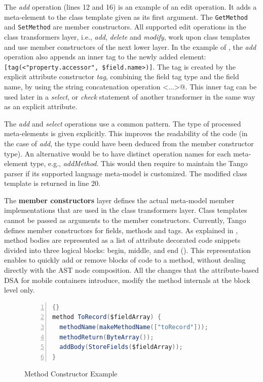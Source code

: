 The \textit{add} operation (lines 12 and 16) is an example of an edit operation. It adds a meta-element to the class template given as its first argument. The {\tt Get\-Me\-thod} and {\tt Set\-Me\-thod} are member constructors. All supported edit operations in the class transformers layer, i.e., \textit{add}, \textit{delete} and \textit{modify}, work upon class templates and use member constructors of the next lower layer. In the example of , the \textit{add} operation also appends an inner tag to the newly added element: \texttt{[tag(<"pro\-pe\-rty.acce\-ssor", \$field.na\-me>)]}. The tag is created by the explicit attribute constructor \textit{tag}, combining the field tag type and the field name, by using the string concatenation operation \verb@<...>@. This inner tag can be used later in a \textit{select}, or \textit{check} statement of another transformer in the same way as an explicit attribute.

The \textit{add} and \textit{select} operations use a common pattern. The type of processed meta-elements is given explicitly. This improves the readability of the code (in the case of \textit{add}, the type could have been deduced from the member constructor type). An alternative would be to have distinct operation names for each meta-element type, e.g., \textit{addMethod}. This would then require to maintain the Tango parser if its supported language meta-model is customized. The modified class template is returned in line 20. %

The \textbf{member constructors} layer defines the actual meta-model member implementations that are used in the class transformers layer. Class templates cannot be passed as arguments to the member constructors. Currently, Tango defines member constructors for fields, methods and tags. As explained in , method bodies are represented as a list of attribute decorated code snippets divided into three logical blocks: begin, middle, and end (). This representation enables to quickly add or remove blocks of code to a method, without dealing directly with the AST node composition. All the changes that the attribute-based DSA for mobile containers introduce, modify the method internals at the block level only.

\begin{figure}[ht]
\begin{center}
\begin{minipage}{7cm}
\begin{scriptsize}
\begin{lstlisting}[numbers=left,language=Java,frame=leftline]{}
method ToRecord($fieldArray) {
  methodName(makeMethodName(["toRecord"]));
  methodReturn(ByteArray());
  addBody(StoreFields($fieldArray));
}
\end{lstlisting}
\end{scriptsize}
\end{minipage}
\end{center}
	\caption{Method Constructor Example}
	\label{fig:method}
\end{figure}

